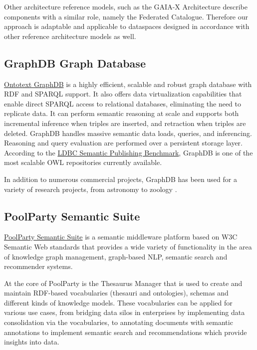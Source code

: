 \documentclass[
  super,
  preprint,
  3p]{elsarticle}
\begin{document}
Other architecture reference models, such as the GAIA-X Architecture
\citep{GaiaXArchitectureDocument2022} describe components with a similar
role, namely the Federated Catalogue. Therefore our approach is
adaptable and applicable to dataspaces designed in accordance with other
reference architecture models as well.

\subsection{GraphDB Graph Database}\label{graphdb-graph-database}

\href{https://graphdb.ontotext.com/}{Ontotext GraphDB} is a highly
efficient, scalable and robust graph database with RDF and SPARQL
support. It also offers data virtualization capabilities that enable
direct SPARQL access to relational databases, eliminating the need to
replicate data. It can perform semantic reasoning at scale and supports
both incremental inference when triples are inserted, and retraction
when triples are deleted. GraphDB handles massive semantic data loads,
queries, and inferencing. Reasoning and query evaluation are performed
over a persistent storage layer. According to the
\href{https://ldbcouncil.org/benchmarks/spb/}{LDBC Semantic Publishing
Benchmark}, GraphDB is one of the most scalable OWL repositories
currently available.

In addition to numerous commercial projects, GraphDB has been used for a
variety of research projects, from astronomy to zoology
\citep{alexievDiverseUsesSemantic2021}.

\subsection{PoolParty Semantic Suite}\label{poolparty-semantic-suite}

\href{https://www.poolparty.biz/}{PoolParty Semantic Suite} is a
semantic middleware platform based on W3C Semantic Web standards that
provides a wide variety of functionality in the area of knowledge graph
management, graph-based NLP, semantic search and recommender systems.

At the core of PoolParty is the Thesaurus Manager that is used to create
and maintain RDF-based vocabularies (thesauri and ontologies), schemas
and different kinds of knowledge models. These vocabularies can be
applied for various use cases, from bridging data silos in enterprises
by implementing data consolidation via the vocabularies, to annotating
documents with semantic annotations to implement semantic search and
recommendations which provide insights into data.
\end{document}
